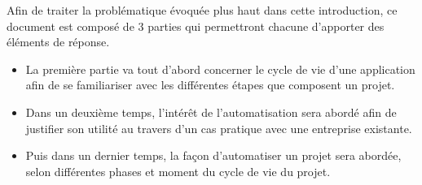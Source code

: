 Afin de traiter la problématique évoquée plus haut dans cette introduction, ce document est composé de 3 parties qui permettront chacune d'apporter des éléments de réponse. 

\begin{itemize}
	\item La première partie va tout d'abord concerner le cycle de vie d'une application afin de se familiariser avec les différentes étapes que composent un projet.
	\item Dans un deuxième temps, l'intérêt de l'automatisation sera abordé afin de justifier son utilité au travers d'un cas pratique avec une entreprise existante.
	\item Puis dans un dernier temps, la façon d'automatiser un projet sera abordée, selon différentes phases et moment du cycle de vie du projet.
\end{itemize}

